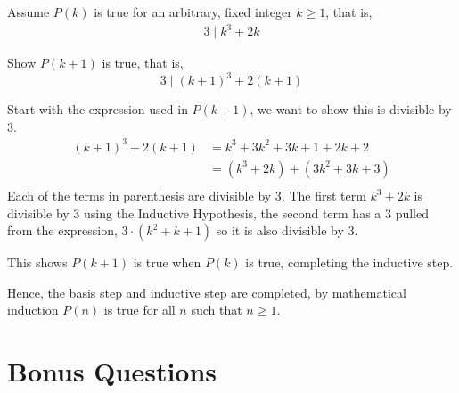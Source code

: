 \begin{questions}
\begin{solution}
Assume $P(k)$ is true for an arbitrary, fixed
 integer $k \geq 1$, that is,
\begin{align*}
  3 \;|\; k^3 + 2k \tag{IH} 
\end{align*}

Show $P(k+1)$ is true, that is,
\[ 3 \;|\; (k+1)^3 + 2(k+1) \]

Start with the expression used in $P(k+1)$, we want to show this is divisible by 3.
\begin{align*}
  (k+1)^3 + 2(k+1) &=  k^3 + 3k^2 + 3k + 1 + 2k + 2 \\
   &= (k^3 + 2k) + (3k^2 + 3k + 3) \\
\end{align*}
Each of the terms in parenthesis are divisible by 3.  The first term $k^3 + 2k$ is divisible by 3 using the Inductive Hypothesis, the second term has a 3 pulled from the expression, $3\cdot(k^2 + k + 1)$ so it is also divisible by 3. 

This shows $P(k+1)$ is true when $P(k)$ is true, completing the
inductive step.

\smallskip
Hence, the basis step and inductive step are completed, by mathematical induction $P(n)$ is true for all $n$ such
that $n\geq 1$.
\end{solution}


\section*{Bonus Questions} 



\end{questions}
